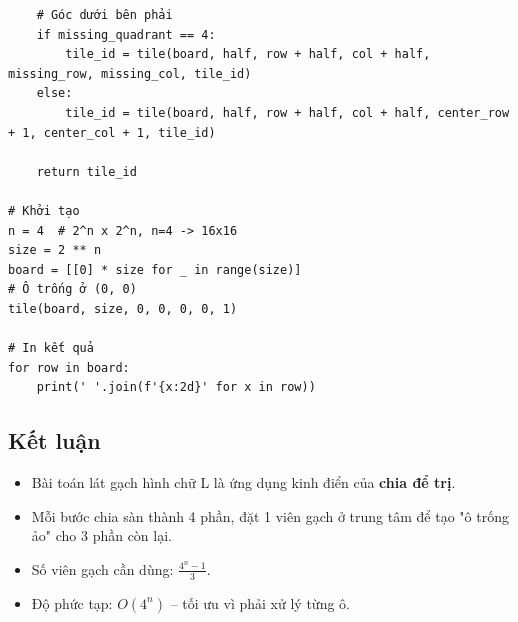 \documentclass{article}
\begin{document}
\begin{verbatim}
    # Góc dưới bên phải
    if missing_quadrant == 4:
        tile_id = tile(board, half, row + half, col + half, missing_row, missing_col, tile_id)
    else:
        tile_id = tile(board, half, row + half, col + half, center_row + 1, center_col + 1, tile_id)
    
    return tile_id

# Khởi tạo
n = 4  # 2^n x 2^n, n=4 -> 16x16
size = 2 ** n
board = [[0] * size for _ in range(size)]
# Ô trống ở (0, 0)
tile(board, size, 0, 0, 0, 0, 1)

# In kết quả
for row in board:
    print(' '.join(f'{x:2d}' for x in row))
\end{verbatim}

\subsection{Kết luận}

\begin{itemize}
    \item Bài toán lát gạch hình chữ L là ứng dụng kinh điển của \textbf{chia để trị}.
    \item Mỗi bước chia sàn thành 4 phần, đặt 1 viên gạch ở trung tâm để tạo "ô trống ảo" cho 3 phần còn lại.
    \item Số viên gạch cần dùng: \(\frac{4^n - 1}{3}\).
    \item Độ phức tạp: \(O(4^n)\) – tối ưu vì phải xử lý từng ô.
\end{itemize}
\end{document}
